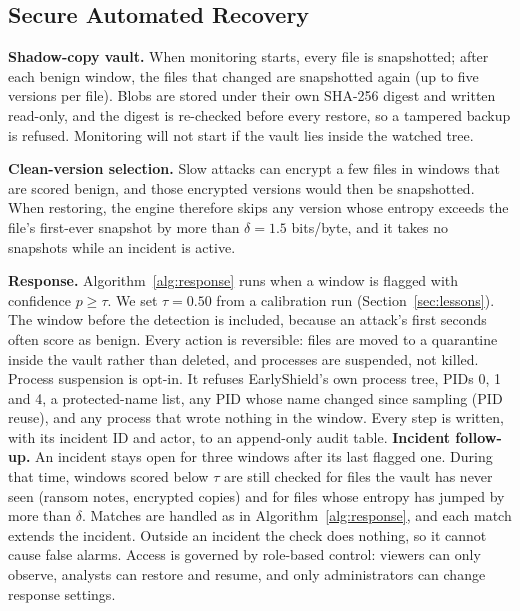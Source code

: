 \documentclass[conference]{IEEEtran}
\begin{document}
\subsection{Secure Automated Recovery}\label{sec:recovery}
\textbf{Shadow-copy vault.} When monitoring starts, every file is snapshotted; after each benign window, the files that changed are snapshotted again (up to five versions per file). Blobs are stored under their own SHA-256 digest and written read-only, and the digest is re-checked before every restore, so a tampered backup is refused. Monitoring will not start if the vault lies inside the watched tree.

\textbf{Clean-version selection.} Slow attacks can encrypt a few files in windows that are scored benign, and those encrypted versions would then be snapshotted. When restoring, the engine therefore skips any version whose entropy exceeds the file's first-ever snapshot by more than $\delta = 1.5$ bits/byte, and it takes no snapshots while an incident is active.

\textbf{Response.} Algorithm~\ref{alg:response} runs when a window is flagged with confidence $p \ge \tau$. We set $\tau = 0.50$ from a calibration run (Section~\ref{sec:lessons}). The window before the detection is included, because an attack's first seconds often score as benign. Every action is reversible: files are moved to a quarantine inside the vault rather than deleted, and processes are suspended, not killed. Process suspension is opt-in. It refuses EarlyShield's own process tree, PIDs 0, 1 and 4, a protected-name list, any PID whose name changed since sampling (PID reuse), and any process that wrote nothing in the window. Every step is written, with its incident ID and actor, to an append-only audit table. \textbf{Incident follow-up.} An incident stays open for three windows after its last flagged one. During that time, windows scored below $\tau$ are still checked for files the vault has never seen (ransom notes, encrypted copies) and for files whose entropy has jumped by more than $\delta$. Matches are handled as in Algorithm~\ref{alg:response}, and each match extends the incident. Outside an incident the check does nothing, so it cannot cause false alarms. Access is governed by role-based control: viewers can only observe, analysts can restore and resume, and only administrators can change response settings.
\end{document}
